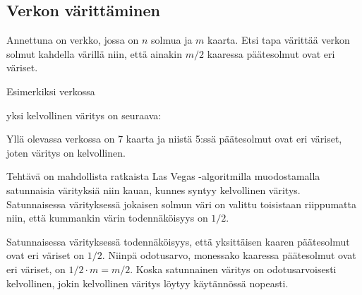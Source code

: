 \subsection{Verkon värittäminen}

\begin{task}
Annettuna on verkko, jossa on $n$ solmua ja $m$ kaarta.
Etsi tapa värittää verkon solmut kahdella värillä
niin, että ainakin $m/2$ kaaressa
päätesolmut ovat eri väriset.
\end{task}

Esimerkiksi verkossa
\begin{center}
\end{center}
yksi kelvollinen väritys on seuraava:
\begin{center}
\end{center}
Yllä olevassa verkossa on 7 kaarta ja niistä 5:ssä
päätesolmut ovat eri väriset,
joten väritys on kelvollinen.

Tehtävä on mahdollista ratkaista Las Vegas -algoritmilla
muodostamalla satunnaisia värityksiä niin kauan,
kunnes syntyy kelvollinen väritys.
Satunnaisessa värityksessä jokaisen solmun väri on
valittu toisistaan riippumatta niin,
että kummankin värin todennäköisyys on $1/2$.

Satunnaisessa värityksessä todennäköisyys, että yksittäisen kaaren päätesolmut
ovat eri väriset on $1/2$. Niinpä odotusarvo, monessako kaaressa
päätesolmut ovat eri väriset, on $1/2 \cdot m = m/2$.
Koska satunnainen väritys on odotusarvoisesti kelvollinen,
jokin kelvollinen väritys löytyy käytännössä nopeasti.